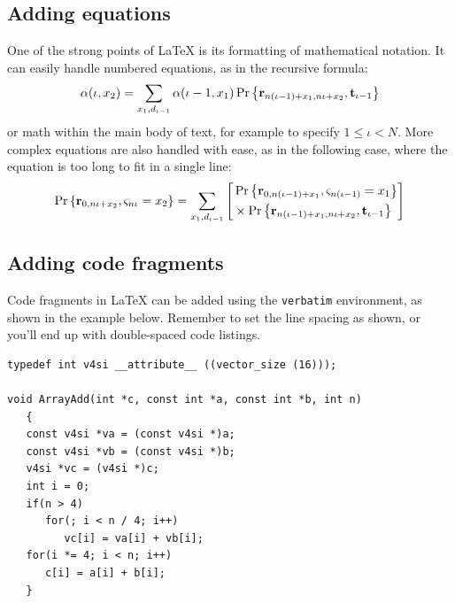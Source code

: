 \subsection{Adding equations}
One of the strong points of \LaTeX{} is its formatting of mathematical notation.
It can easily handle numbered equations, as in the recursive formula:
\begin{equation}
   \alpha(\iota,x_2) = \sum_{x_1,d_{\iota-1}} \alpha(\iota-1,x_1)
   \Pr\left\{ \mathbf{r}_{n(\iota-1)+x_1,n\iota+x_2}, \mathbf{t}_{\iota-1} \right\}
\end{equation}
or math within the main body of text, for example to specify $1 \leq \iota
   < N$.
More complex equations are also handled with ease, as in the following case,
where the equation is too long to fit in a single line:
\begin{equation}
   \Pr\left\{\mathbf{r}_{0,n\iota+x_2}, \varsigma_{n\iota}=x_2\right\}
   = \sum_{x_1,d_{\iota-1}} \left[
      \begin{split}
         & \Pr\left\{\mathbf{r}_{0,n(\iota-1)+x_1}, \varsigma_{n(\iota-1)}=x_1\right\} \\
         & \times \Pr\left\{ \mathbf{r}_{n(\iota-1)+x_1,n\iota+x_2}, \mathbf{t}_{\iota-1} \right\}
      \end{split} \right]
\end{equation}

\subsection{Adding code fragments}
Code fragments in \LaTeX{} can be added using the \verb|verbatim| environment,
as shown in the example below.
Remember to set the line spacing as shown, or you'll end up with double-spaced
code listings.

\singlespaced
\begin{verbatim}
typedef int v4si __attribute__ ((vector_size (16)));

void ArrayAdd(int *c, const int *a, const int *b, int n)
   {
   const v4si *va = (const v4si *)a;
   const v4si *vb = (const v4si *)b;
   v4si *vc = (v4si *)c;
   int i = 0;
   if(n > 4)
      for(; i < n / 4; i++)
         vc[i] = va[i] + vb[i];
   for(i *= 4; i < n; i++)
      c[i] = a[i] + b[i];
   }
\end{verbatim}
\doublespaced

